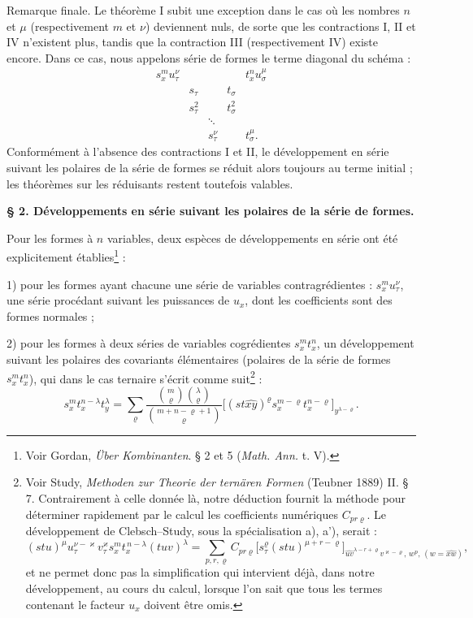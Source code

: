 \documentclass[11pt]{article}
\begin{document}
Remarque finale. Le théorème I subit une exception dans le cas où les nombres $n$ et $\mu$ (respectivement $m$ et $\nu$) deviennent nuls, de sorte que les contractions I, II et IV n'existent plus, tandis que la contraction III (respectivement IV) existe encore. Dans ce cas, nous appelons série de formes le terme diagonal du schéma :
\[
\begin{array}{ccccc}
s_x^m u_\tau^\nu &&&& t_x^n u_\sigma^\mu\\
& s_\tau && t_\sigma &\\
& s_\tau^2 && t_\sigma^2 &\\
&&\ddots&&\\
&&s_\tau^\nu && t_\sigma^\mu .
\end{array}
\]
Conformément à l'absence des contractions I et II, le développement en série suivant les polaires de la série de formes se réduit alors toujours au terme initial ; les théorèmes sur les réduisants restent toutefois valables.

\begin{center}
\textbf{\S{} 2. \quad Développements en série suivant les polaires de la série de formes.}
\end{center}

Pour les formes à $n$ variables, deux espèces de développements en série ont été explicitement établies\footnote{Voir Gordan, \emph{Über Kombinanten}. \S{} 2 et 5 (\emph{Math. Ann.} t. V).} :

1) pour les formes ayant chacune une série de variables contragrédientes : $s_x^m u_\tau^\nu$, une série procédant suivant les puissances de $u_x$, dont les coefficients sont des \og{} formes normales \fg{} ;

2) pour les formes à deux séries de variables cogrédientes $s_x^m t_x^n$, un développement suivant les polaires des covariants élémentaires (polaires de la série de formes $s_x^m t_x^n$), qui dans le cas ternaire s'écrit comme suit\footnote{Voir Study, \emph{Methoden zur Theorie der ternären Formen} (Teubner 1889) II. \S{} 7. Contrairement à celle donnée là, notre déduction fournit la méthode pour déterminer rapidement par le calcul les coefficients numériques $C_{pr\varrho}$. Le développement de Clebsch--Study, sous la spécialisation a), a'), serait :
\[
(stu)^\mu u_\tau^{\nu-\varkappa}v_\tau^\varkappa s_x^m t_x^{\,n-\lambda}(tuv)^\lambda
=\sum_{p,r,\varrho} C_{pr\varrho}
\bigl[s_\tau^\varrho(stu)^{\mu+r-\varrho}\bigr]_{\widehat{uv}^{\lambda-r+\varrho}v^{\varkappa-\varrho},\,w^p,\,(w=\widehat{xw})},
\]
et ne permet donc pas la simplification qui intervient déjà, dans notre développement, au cours du calcul, lorsque l'on sait que tous les termes contenant le facteur $u_x$ doivent être omis.} :
\[
\tag{I}
s_x^m t_x^{n-\lambda}t_y^\lambda
=\sum_{\varrho}
\frac{\binom{m}{\varrho}\binom{\lambda}{\varrho}}
{\binom{m+n-\varrho+1}{\varrho}}
\bigl[(st\widehat{xy})^\varrho s_x^{m-\varrho}t_x^{n-\varrho}\bigr]_{y^{\lambda-\varrho}}.
\]
\end{document}
